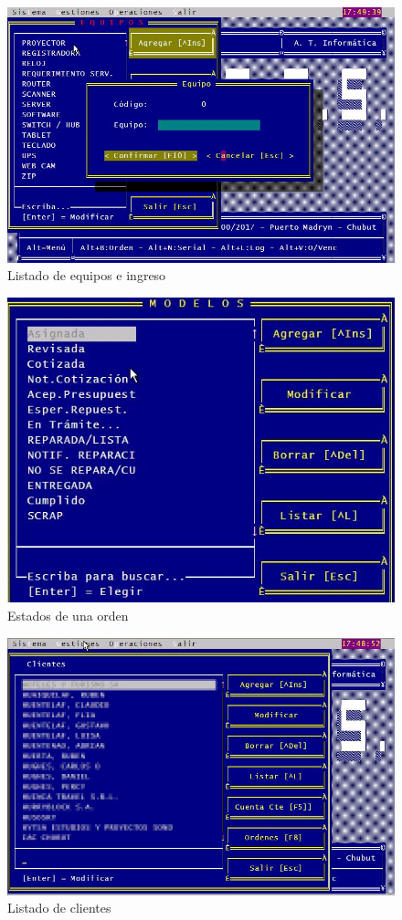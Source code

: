 \documentclass[12pt]{extarticle}
\begin{document}
\begin{figure}[h]
\includegraphics[scale=0.5]{images/equipo_e_ingreso.jpg}
\caption{Listado de equipos e ingreso}
\end{figure}

\begin{figure}[h]
\includegraphics[scale=0.5]{images/estados_orden.jpg}
\caption{Estados de una orden}
\end{figure}

\begin{figure}[h]
\includegraphics[scale=0.5]{images/listado_clientes.jpg}
\caption{Listado de clientes}
\end{figure}
\end{document}
